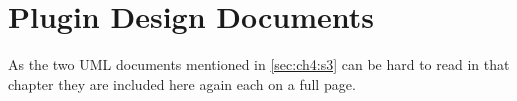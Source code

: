 \chapter{Plugin Design Documents}
\label{chap:appendix:design_docs}
As the two \gls{UML}  documents mentioned in \cref{sec:ch4:s3} can be hard to read in that chapter they are included here again each on a full page.


